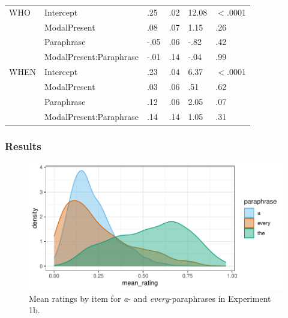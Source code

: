 \documentclass[12pt,letterpaper,table,svgnames,dvipsnames]{article}
\begin{document}
\begin{table}[p!]
\begin{center}
\begin{tabular}{l|lllll}
\midrule
WHO & Intercept & .25 & .02 & 12.08 & $<$.0001\\
{} & ModalPresent & .08 & .07 & 1.15 & .26\\
{} & Paraphrase & -.05 & .06 & -.82 & .42\\
{} & ModalPresent:Paraphrase & -.01 & .14 & -.04 & .99\\
\midrule
WHEN & Intercept & .23 & .04 & 6.37 & $<$.0001\\
{} & ModalPresent & .03 & .06 & .51 & .62\\
{} & Paraphrase & .12 & .06 & 2.05 & .07\\
{} & ModalPresent:Paraphrase & .14 & .14 & 1.05 & .31\\
\bottomrule
\end{tabular} 
\end{center} 
\end{table}

\subsubsection{Results}

\begin{figure}[h!]
\centering
\includegraphics[scale=1]{figures/ex1b_denisty_mean_ratings.pdf}
\caption{Mean ratings by item for \emph{a}- and \emph{every}-paraphrases in Experiment 1b.}
\label{ex1b_density_mr}
\end{figure}
\end{document}
